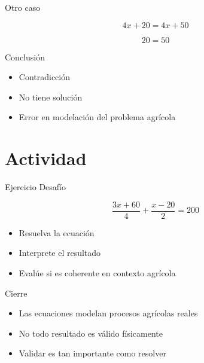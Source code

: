 \documentclass[10pt]{beamer}
\newcommand{\pp}{\pause}
\begin{document}
	\begin{frame}{Otro caso}
		
		\[
		4x + 20 = 4x + 50
		\]
		
		\pp
		
		\[
		20 = 50
		\]
		
		\pp
		
		\begin{block}{Conclusión}
			\begin{itemize}
				\item Contradicción
				\item No tiene solución
				\item Error en modelación del problema agrícola
			\end{itemize}
		\end{block}
		
	\end{frame}
	
	\section{Actividad}
	
	\begin{frame}{Ejercicio Desafío}
		
		\[
		\frac{3x + 60}{4} + \frac{x - 20}{2} = 200
		\]
		
		\begin{itemize}
			\item Resuelva la ecuación
			\item Interprete el resultado
			\item Evalúe si es coherente en contexto agrícola
		\end{itemize}
		
	\end{frame}
	
	\begin{frame}{Cierre}
		
		\begin{itemize}
			\item Las ecuaciones modelan procesos agrícolas reales
			\item No todo resultado es válido físicamente
			\item Validar es tan importante como resolver
		\end{itemize}
		
	\end{frame}
	
\end{document}
